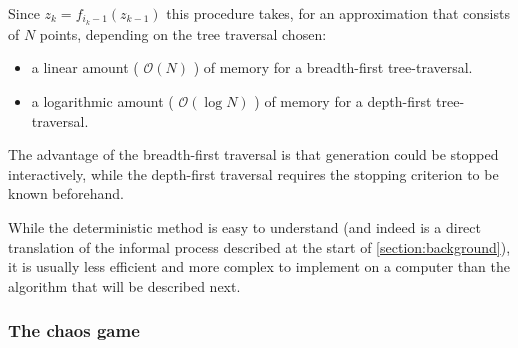 \documentclass[11pt]{article}
\begin{document}
Since \(z_{k} = f_{i_k-1}(z_{k-1})\) this procedure takes, for an approximation that consists of \(N\) points, depending on the tree traversal chosen:

\begin{itemize}
\item a linear amount ( \(\mathcal{O}(N)\) ) of memory  for a breadth-first tree-traversal.
\item a logarithmic amount ( \(\mathcal{O}(\log{N})\) ) of memory for a depth-first tree-traversal.
\end{itemize}

The advantage of the breadth-first traversal is that generation could be stopped interactively,
while the depth-first traversal requires the stopping criterion to be known beforehand. \cite{hepting1991rendering}

While the deterministic method is easy to understand (and indeed is a direct translation of the informal process described at the start of \autoref{section:background}),
it is usually less efficient and more complex to implement on a computer than the algorithm that will be described next.

\subsubsection{The chaos game}
\label{sec:orgf93f516}
\label{subsection:chaos_game}
\end{document}
